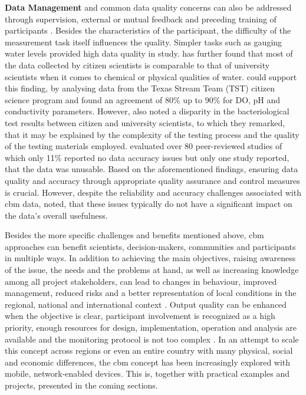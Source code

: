 \textbf{Data Management} and common data quality concerns can also be addressed through supervision, external or mutual feedback and preceding training of participants \autocite{albusAccuracyLongtermVolunteer2020,baalbakiCitizenScienceLebanon2019,fraislCitizenScienceEnvironmental2022}. Besides the characteristics of the participant, the difficulty of the measurement task itself influences the quality. Simpler tasks such as gauging water levels provided high data quality in \textcite{weeserCitizenSciencePioneers2018a} study. \Textcite{baalbakiCitizenScienceLebanon2019} has further found that most of the data collected by citizen scientists is comparable to that of university scientists when it comes to chemical or physical qualities of water. \autocite{albusAccuracyLongtermVolunteer2020} could support this finding, by analysing data from the Texas Stream Team (TST) citizen science program and found an agreement of 80\% up to 90\% for DO, pH and conductivity parameters. However, \textcite{baalbakiCitizenScienceLebanon2019} also noted a disparity in the bacteriological test results between citizen and university scientists, to which they remarked, that it may be explained by the complexity of the testing process and the quality of the testing materials employed. \Textcite{aceves-buenoCitizenScienceApproach2015} evaluated over 80 peer-reviewed studies of which only 11\% reported no data accuracy issues but only one study reported, that the data was unusable. Based on the aforementioned findings, ensuring data quality and accuracy through appropriate quality assurance and control measures is crucial. However, despite the reliability and accuracy challenges associated with \acrshort{cbm} data, \textcite{aceves-buenoCitizenScienceApproach2015} noted, that these issues typically do not have a significant impact on the data's overall usefulness.

Besides the more specific challenges and benefits mentioned above, \acrlong{cbm} approaches can benefit scientists, decision-makers, communities and participants in multiple ways. In addition to achieving the main objectives, raising awareness of the issue, the needs and the problems at hand, as well as increasing knowledge among all project stakeholders, can lead to changes in behaviour, improved management, reduced risks and a better representation of local conditions in the regional, national and international context \autocite{huangManagementDrinkingWater2020,walkerBenefitsNegativeImpacts2021}. Output quality can be enhanced when the objective is clear, participant involvement is recognized as a high priority, enough resources for design, implementation, operation and analysis are available and the monitoring protocol is not too complex \autocite{butteFrameworkWaterSecurity2022, pocockStrategicFrameworkSupport2014}.\newline
In an attempt to scale this concept across regions or even an entire country with many physical, social and economic differences, the \acrshort{cbm} concept has been increasingly explored with mobile, network-enabled devices. This is, together with practical examples and projects, presented in the coming sections.

